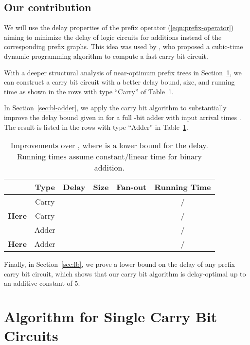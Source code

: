 \documentclass[11pt,final,microtype]{scrartcl}
\theoremstyle{plain}
\theoremstyle{definition}
\theoremstyle{remark}
\begin{document}
\subsection{Our contribution}
We will use the delay properties of the prefix operator
(\ref{eqn:prefix-operator}) aiming to minimize the delay of logic
circuits for additions instead of the corresponding prefix
graphs. This idea was used by \cite{bonn1}, who proposed a cubic-time
dynamic programming algorithm to compute a fast carry bit circuit.

With a deeper structural analysis of near-optimum prefix trees in
Section~\ref{sec:bl-core}, we can construct a carry bit circuit with a
better delay bound, size, and running time as shown in the
rows with type ``Carry'' of Table~\ref{tbl:bl-improve}.

In Section~\ref{sec:bl-adder}, we apply the carry bit algorithm to
substantially improve the delay bound given in \cite{bonn2} for a full
-bit adder with input arrival times . The result is listed in the rows with type ``Adder'' in
Table~\ref{tbl:bl-improve}.

\begin{table}[!b]
\small
  \begin{center}
  {\begin{tabular}{|c|c|c|c|c|c|}
        \hline
                     & \textbf{Type}  & \textbf{Delay} & \textbf{Size} & \textbf{Fan-out} & \textbf{Running Time} \\
        \hline
        \cite{bonn1}       & Carry  &  &  &   &   /  \\
\textbf{Here} & Carry &  &  &  &   /  \\
        \hline
        \cite{bonn2}       & Adder  &  &  &   &  / \\
        \textbf{Here} & Adder  & 
        &  &   &  /  \\
        \hline
      \end{tabular}
}
\end{center}
\caption{Improvements over \cite{bonn1,bonn2}, where  is a lower bound for the delay. Running times 
assume  constant/linear time for binary addition.}
\label{tbl:bl-improve}
\end{table} 


Finally, in Section~\ref{sec:lb}, we prove a lower bound on the delay
of any prefix carry bit circuit, which shows that our carry bit
algorithm is delay-optimal up to an additive constant of 5.


\section{Algorithm for Single Carry Bit Circuits} \label{sec:bl-core} 
\end{document}
